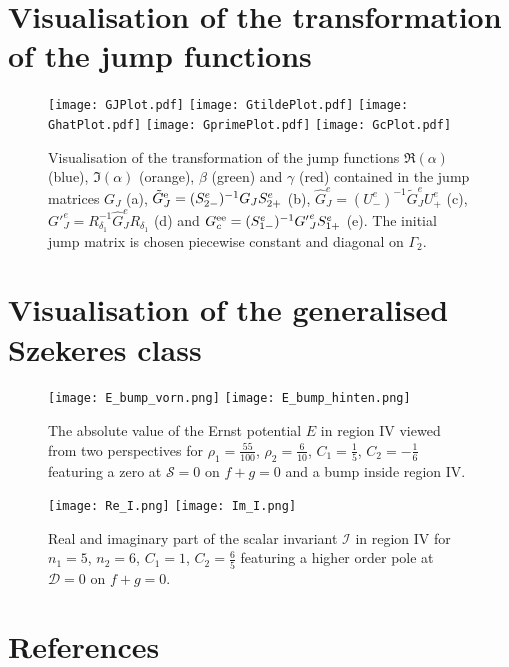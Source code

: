 \documentclass[12pt]{iopart}
\begin{document}
\appendix

\section{Visualisation of the transformation of the jump functions}

\begin{figure}[ht]
\centering
\texttt{[image: GJPlot.pdf]}\;\;
\texttt{[image: GtildePlot.pdf]}
\texttt{[image: GhatPlot.pdf]}\;\;
\texttt{[image: GprimePlot.pdf]}
\texttt{[image: GcPlot.pdf]}
\caption{Visualisation of the transformation of the jump functions $\Re(\alpha)$ (blue), $\Im(\alpha)$ (orange), $\beta$ (green) and $\gamma$ (red) contained in the jump matrices $G_J$ (a), $\tilde{G}_J^{\rm e}=(S^e_{2-})^{-1} G_J S^e_{2+}$ (b), $\hat{G}_J^e=(U^{e}_-)^{-1}\tilde{G}_J^eU^e_+$ (c), ${G'}_J^e=R_{\delta_1}^{-1}\hat{G}_J^eR_{\delta_1}$ (d) and $G_c^{\rm ee}=(S^e_{1-})^{-1} {G'}_J^e S^e_{1+}$ (e). The initial jump matrix is chosen piecewise constant and diagonal on $\Gamma_2$.}
\label{fig:VisTrafo}
\end{figure} 

\section{Visualisation of the generalised Szekeres class}

\begin{figure}[ht]
\centering
\texttt{[image: E\_bump\_vorn.png]}\qquad
\texttt{[image: E\_bump\_hinten.png]}
\caption{The absolute value of the Ernst potential $E$ in region IV viewed from two perspectives for $\rho_1=\frac{55}{100}$, $\rho_2=\frac{6}{10}$, $C_1=\frac15$, $C_2=-\frac16$ featuring a zero at $\mathcal{S}=0$ on $f+g=0$ and a bump inside region IV.}
\label{fig:E}
\end{figure} 

\begin{figure}[ht]
\centering
\texttt{[image: Re\_I.png]}\qquad
\texttt{[image: Im\_I.png]}
\caption{Real and imaginary part of the scalar invariant $\mathcal{I}$ in region IV  for $n_1=5$, $n_2=6$, $C_1=1$, $C_2=\frac65$ featuring a higher order pole at $\mathcal{D}=0$ on $f+g=0$.}
\label{fig:I}
\end{figure} 



\section*{References}
\end{document}
